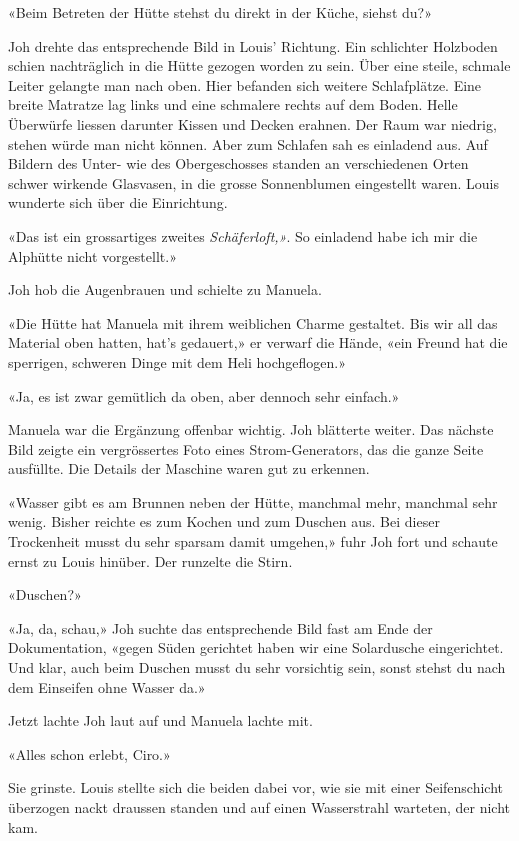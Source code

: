 «Beim Betreten der Hütte stehst du direkt in der Küche, siehst du?»

Joh drehte das entsprechende Bild in Louis’ Richtung.
Ein schlichter Holzboden schien nachträglich in die Hütte gezogen worden
zu sein. Über eine steile, schmale Leiter gelangte man nach oben. Hier
befanden sich weitere Schlafplätze. Eine breite Matratze lag links und
eine schmalere rechts auf dem Boden. Helle Überwürfe liessen darunter Kissen und Decken erahnen. 
Der Raum war niedrig, stehen würde man nicht können. Aber zum Schlafen sah es einladend aus. Auf Bildern
des Unter- wie des Obergeschosses standen an verschiedenen Orten schwer
wirkende Glasvasen, in die grosse Sonnenblumen eingestellt waren.
Louis wunderte sich über die Einrichtung.

«Das ist ein grossartiges zweites \emph{Schäferloft,»}. 
So einladend habe ich mir die Alphütte nicht vorgestellt.»

Joh hob die Augenbrauen und schielte zu Manuela.

«Die Hütte hat Manuela mit ihrem weiblichen Charme gestaltet. Bis wir
all das Material oben hatten, hat’s gedauert,» er verwarf die Hände,
«ein Freund hat die sperrigen, schweren Dinge mit dem Heli hochgeflogen.»

«Ja, es ist zwar gemütlich da oben, aber dennoch sehr einfach.»

Manuela war die Ergänzung offenbar wichtig.
Joh blätterte weiter. Das nächste Bild zeigte ein vergrössertes Foto
eines Strom-Generators, das die ganze Seite ausfüllte. Die Details der
Maschine waren gut zu erkennen.

«Wasser gibt es am Brunnen neben der Hütte, manchmal mehr, manchmal sehr
wenig. Bisher reichte es zum Kochen und zum Duschen aus. Bei dieser
Trockenheit musst du sehr sparsam damit umgehen,» fuhr Joh fort und
schaute ernst zu Louis hinüber. Der runzelte die Stirn.

«Duschen?»

«Ja, da, schau,» Joh suchte das entsprechende Bild fast am Ende der
Dokumentation, «gegen Süden gerichtet haben wir eine Solardusche
eingerichtet. Und klar, auch beim Duschen musst du sehr vorsichtig sein,
sonst stehst du nach dem Einseifen ohne Wasser da.»

Jetzt lachte Joh laut auf und Manuela lachte mit.

«Alles schon erlebt, Ciro.»

Sie grinste. Louis stellte sich die beiden dabei vor, wie sie mit einer
Seifenschicht überzogen nackt draussen standen und auf einen
Wasserstrahl warteten, der nicht kam.

